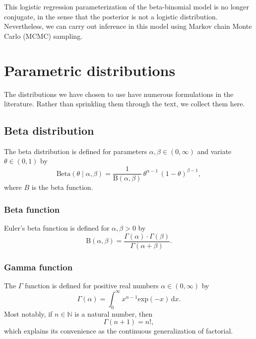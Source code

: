 \documentclass[11pt]{report}
\begin{document}
This logistic regression parameterization of the beta-binomial model
is no longer conjugate, in the sense that the posterior is not a
logistic distribution.  Nevertheless, we can carry out inference in
this model using Markov chain Monte Carlo (MCMC) sampling.



\nocite{aitchison1982statistical}
\nocite{gelman2012we}


\appendix

\chapter{Parametric distributions}

The distributions we have chosen to use have numerous formulations in
the literature.  Rather than sprinkling them through the text, we
collect them here.

\section{Beta distribution}\label{sec:beta-distribution}

The beta distribution is defined for parameters $\alpha, \beta \in (0,
\infty)$ and variate $\theta \in (0, 1)$ by
\[
  \textrm{Beta}(\theta \mid \alpha, \beta)
  = \frac{1}{\textrm{B}(\alpha, \beta)}
  \, \theta^{\alpha - 1}
  \, (1 - \theta)^{\beta - 1},
\]
where $B$ is the beta function.

\subsection{Beta function}

Euler's beta function is defined for $\alpha, \beta > 0$ by
\[
  \textrm{B}(\alpha, \beta)
  = \frac{\Gamma(\alpha) \cdot \Gamma(\beta)}
         {\Gamma(\alpha + \beta)}.
\]

\subsection{Gamma function}

The $\Gamma$ function is defined for positive real numbers $\alpha \in
(0, \infty)$ by
\[
  \Gamma(\alpha) = \int_0^{\infty} x^{\alpha - 1} \textrm{exp}(-x) \, \textrm{d}x.
\]
Most notably, if $n \in \mathbb{N}$ is a natural number, then
\[
  \Gamma(n + 1) = n!,
\]
which explains its convenience as the continuous generalization of
factorial.
\end{document}
